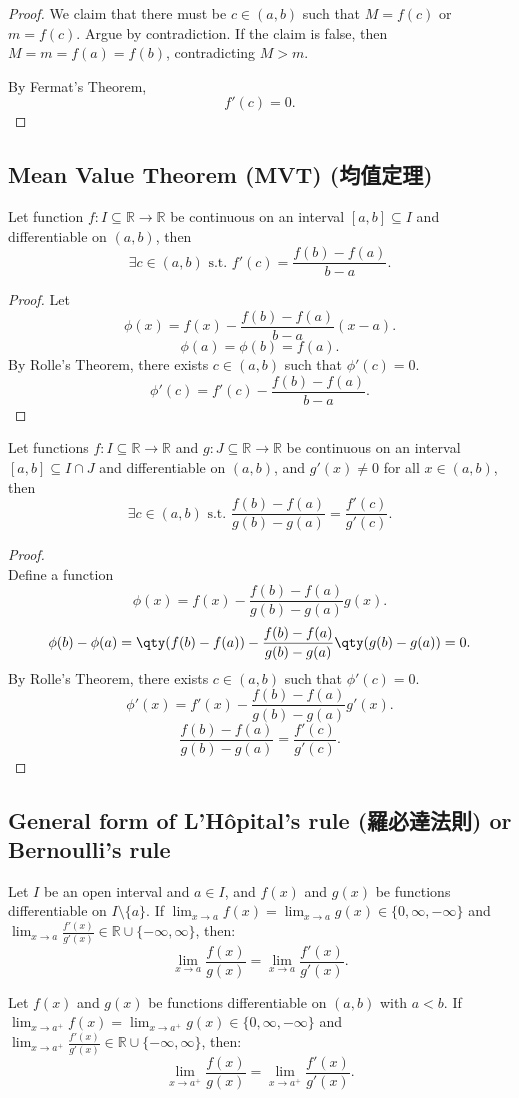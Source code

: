 \documentclass[a4paper,12pt]{report}
\begin{document}
\begin{itemize}
\begin{itemize}
\begin{proof}
We claim that there must be $c\in (a,b)$ such that $M=f(c)$ or $m=f(c)$. Argue by contradiction. If the claim is false, then $M=m=f(a)=f(b)$, contradicting $M>m$.

By Fermat's Theorem,
\[f'(c)=0.\]
\end{proof}
\subsection{Mean Value Theorem (MVT) (均值定理)}
Let function $f\colon I\subseteq\mathbb{R}\to\mathbb{R}$ be continuous on an interval $[a, b]\subseteq I$ and differentiable on $(a,b)$, then
\[\exists c\in (a, b)\text{\ s.t.\ }f'(c)=\frac{f(b)-f(a)}{b-a}.\]
\begin{proof}
Let
\[\phi(x) = f(x) - \frac{f(b)-f(a)}{b-a} (x-a).\]
\[\phi(a)=\phi(b)=f(a).\]
By Rolle's Theorem, there exists $c\in (a,b)$ such that $\phi'(c)=0$.
\[\phi'(c)=f'(c)-\frac{f(b)-f(a)}{b-a}.\]
\end{proof}
Let functions $f\colon I\subseteq\mathbb{R}\to\mathbb{R}$ and $g\colon J\subseteq\mathbb{R}\to\mathbb{R}$ be continuous on an interval $[a, b]\subseteq I\cap J$ and differentiable on $(a,b)$, and $g'(x)\neq 0$ for all $x\in (a,b)$, then
\[\exists c\in (a,b)\text{\ s.t.\ }\frac{f(b)-f(a)}{g(b)-g(a)}=\frac{f'(c)}{g'(c)}.\]
\begin{proof}\mbox{}\\
    Define a function
    \[\phi(x)=f(x)-\frac{f(b)-f(a)}{g(b)-g(a)}g(x).\]
    \[\phi(b)-\phi(a)=\qty(f(b)-f(a))-\frac{f(b)-f(a)}{g(b)-g(a)}\qty(g(b)-g(a))=0.\]
    By Rolle's Theorem, there exists $c\in (a,b)$ such that $\phi'(c)=0$.
    \[\phi'(x)=f'(x)-\frac{f(b)-f(a)}{g(b)-g(a)}g'(x).\]
    \[\frac{f(b)-f(a)}{g(b)-g(a)}=\frac{f'(c)}{g'(c)}.\]
\end{proof}
\subsection{General form of L'Hôpital's rule (羅必達法則) or Bernoulli's rule}
Let $I$ be an open interval and $a\in I$, and $f(x)$ and $g(x)$ be functions differentiable on $I\setminus\{a\}$. If $\lim_{x\to a}f(x)=\lim_{x\to a}g(x)\in\{0,\infty,-\infty\}$ and $\lim_{x\to a}\frac{f'(x)}{g'(x)}\in\mathbb{R}\cup\{-\infty,\infty\}$, then:
\[\lim_{x\to a}\frac{f(x)}{g(x)}=\lim_{x\to a}\frac{f'(x)}{g'(x)}.\]

Let $f(x)$ and $g(x)$ be functions differentiable on $(a,b)$ with $a<b$. If $\lim_{x\to a^+}f(x)=\lim_{x\to a^+}g(x)\in\{0,\infty,-\infty\}$ and $\lim_{x\to a^+}\frac{f'(x)}{g'(x)}\in\mathbb{R}\cup\{-\infty,\infty\}$, then:
\[\lim_{x\to a^+}\frac{f(x)}{g(x)}=\lim_{x\to a^+}\frac{f'(x)}{g'(x)}.\]


\end{itemize}
\end{itemize}
\end{document}
